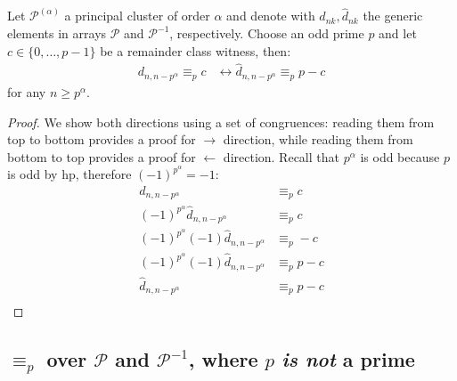 \begin{theorem}
    Let $\mathcal{P}^{(\alpha)}$ a principal cluster of order $\alpha$ and denote with 
    $d_{nk}, \hat{d}_{nk}$ the generic elements in arrays $\mathcal{P}$ and $\mathcal{P}^{-1}$,
    respectively. 
    Choose an odd prime $p$ and let $c\in \lbrace 0, \ldots, p-1 \rbrace$ be a remainder class
    witness, then:
    \begin{displaymath}
        \begin{split}
            d_{n,n-p^{\alpha}} \equiv_{p} c &\leftrightarrow \hat{d}_{n,n-p^{\alpha}} \equiv_{p} p-c
        \end{split}
    \end{displaymath}
    for any $n\geq p^{\alpha}$.
\end{theorem}
\begin{proof}
We show both directions using a set of congruences: reading them from top to bottom provides a 
proof for $\rightarrow$ direction, while reading them from bottom to top provides a proof for 
$\leftarrow$ direction. Recall that $p^\alpha$ is odd because $p$ is odd by hp, therefore $(-1)^{p^\alpha} = -1$:
\begin{displaymath}
    \begin{split}
        d_{n,n-p^{\alpha}} &\equiv_{p} c \\
        (-1)^{p^\alpha}\hat{d}_{n,n-p^{\alpha}} &\equiv_{p} c \\
        (-1)^{p^\alpha }(-1)\hat{d}_{n,n-p^{\alpha}} &\equiv_{p} -c \\
        (-1)^{p^\alpha }(-1)\hat{d}_{n,n-p^{\alpha}} &\equiv_{p} p -c \\
        \hat{d}_{n,n-p^{\alpha}} &\equiv_{p} p -c \\
    \end{split}
\end{displaymath}
\end{proof}

\subsection{$\equiv_{p}$ over $\mathcal{P}$ and $\mathcal{P}^{-1}$,
    where $p$ \emph{is not} a prime}

\label{subsection:pascal:congruence:characterization:p:not:prime}



